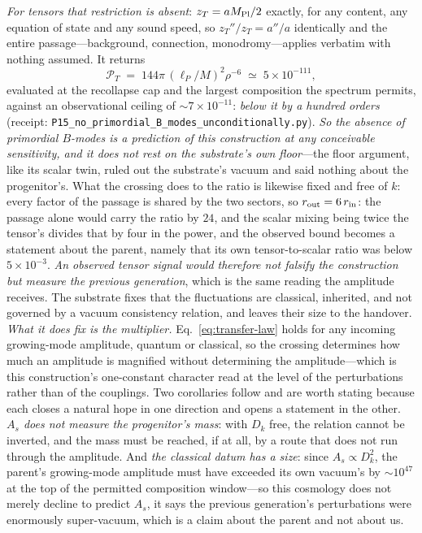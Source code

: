 \documentclass[11pt,a4paper]{article}
\theoremstyle{plain}
\theoremstyle{definition}
\theoremstyle{remark}
\begin{document}
\emph{For tensors that restriction is absent}: $z_T=aM_{\rm Pl}/2$ exactly, for any content, any equation of state and any sound speed, so $z_T''/z_T=a''/a$ identically and the entire passage---background, connection, monodromy---applies verbatim with nothing assumed. It returns
\begin{equation}\label{eq:tensor-floor}
\mathcal{P}_T \;=\; 144\pi\,(\ell_P/M)^2\rho^{-6}\;\simeq\;5\times10^{-111},
\end{equation}
evaluated at the recollapse cap and the largest composition the spectrum permits, against an observational ceiling of $\sim7\times10^{-11}$: \emph{below it by a hundred orders} (receipt: \texttt{P15\_no\_primordial\_B\_modes\_unconditionally.py}). \emph{So the absence of primordial $B$-modes is a prediction of this construction at any conceivable sensitivity, and it does not rest on the substrate's own floor}---the floor argument, like its scalar twin, ruled out the substrate's vacuum and said nothing about the progenitor's. What the crossing does to the ratio is likewise fixed and free of $k$: every factor of the passage is shared by the two sectors, so $r_{\rm out}=6\,r_{\rm in}$: the passage alone would carry the ratio by $24$, and the scalar mixing being twice the tensor's divides that by four in the power, and the observed bound becomes a statement about the parent, namely that its own tensor-to-scalar ratio was below $5\times10^{-3}$. \emph{An observed tensor signal would therefore not falsify the construction but measure the previous generation}, which is the same reading the amplitude receives. The substrate fixes that the fluctuations are classical, inherited, and not governed by a vacuum consistency relation, and leaves their size to the handover. \emph{What it does fix is the multiplier.} Eq.~\eqref{eq:transfer-law} holds for any incoming growing-mode amplitude, quantum or classical, so the crossing determines how much an amplitude is magnified without determining the amplitude---which is this construction's one-constant character read at the level of the perturbations rather than of the couplings. Two corollaries follow and are worth stating because each closes a natural hope in one direction and opens a statement in the other. \emph{$A_s$ does not measure the progenitor's mass}: with $D_k$ free, the relation cannot be inverted, and the mass must be reached, if at all, by a route that does not run through the amplitude. And \emph{the classical datum has a size}: since $A_s\propto D_k^2$, the parent's growing-mode amplitude must have exceeded its own vacuum's by $\sim10^{47}$ at the top of the permitted composition window---so this cosmology does not merely decline to predict $A_s$, it says the previous generation's perturbations were enormously super-vacuum, which is a claim about the parent and not about us.
\end{document}

